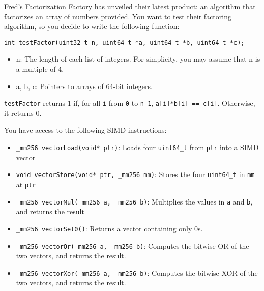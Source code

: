 
\question
Fred’s Factorization Factory has unveiled their latest product: an algorithm that factorizes an array of numbers provided. You want to test their factoring algorithm, so you decide to write the following function:
\begin{verbatim}
int testFactor(uint32_t n, uint64_t *a, uint64_t *b, uint64_t *c);
\end{verbatim}
\begin{itemize}
    \item 
    n: The length of each list of integers. For simplicity, you may assume that n is a multiple of 4.
    
    \item
    a, b, c: Pointers to arrays of 64-bit integers.
    
\end{itemize}

\texttt{testFactor} returns 1 if, for all \texttt{i} from \texttt{0} to \texttt{n-1}, \texttt{a[i]*b[i] == c[i]}. Otherwise, it returns 0.

You have access to the following SIMD instructions:
\begin{itemize}
    \item 
    \texttt{\_mm256 vectorLoad(void* ptr)}: Loads four \texttt{uint64\_t} from \texttt{ptr} into a SIMD vector
    
    \item
    \texttt{void vectorStore(void* ptr, \_mm256 mm)}: Stores the four \texttt{uint64\_t} in \texttt{mm} at \texttt{ptr}
    
    \item
    \texttt{\_mm256 vectorMul(\_mm256 a, \_mm256 b)}: Multiplies the values in \texttt{a} and \texttt{b}, and returns the result
    
    \item
    \texttt{\_mm256 vectorSet0()}: Returns a vector containing only 0s.
    
    \item
    \texttt{\_mm256 vectorOr(\_mm256 a, \_mm256 b)}: Computes the bitwise OR of the two vectors, and returns the result.
    
    \item
    \texttt{\_mm256 vectorXor(\_mm256 a, \_mm256 b)}: Computes the bitwise XOR of the two vectors, and returns the result.
    
\end{itemize}

